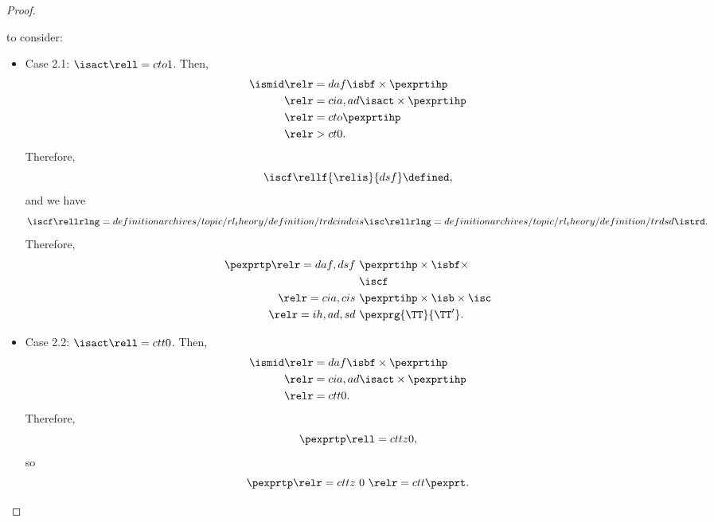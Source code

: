 \begin{proof}
\begin{itemize}
       to consider:
      \begin{itemize}
        \item Case 2.1: $\isact \rell = cto 1$.
          Then,
          \begin{align*}
            \ismid &\relr = daf \isbf \times \pexprtihp\\
                   &\relr = cia,ad \isact \times \pexprtihp\\
                   &\relr = cto \pexprtihp\\
                   &\relr > ct 0.
          \end{align*}
          Therefore, 
          $$\iscf \rellf{\relis}{dsf} \defined,$$
          and we have
          $$\iscf 
          \rellrlng = definition archives/topic/rl_theory/definition/trdcind cis \isc 
          \rellrlng = definition archives/topic/rl_theory/definition/trd sd \istrd.$$
          Therefore,
          \begin{align*}
            \pexprtp 
            \relr = daf,dsf \ & \pexprtihp \times \isbf \times\\& \iscf\\
            \relr = cia,cis \ & \pexprtihp \times \isb \times \isc\\
            \relr = ih,ad,sd \ & \pexprg{\TT}{\TT'}.
          \end{align*}
        \item Case 2.2: $\isact \rell = ctt 0$.
          Then,
          \begin{align*}
            \ismid &\relr = daf \isbf \times \pexprtihp\\
                   &\relr = cia,ad \isact \times \pexprtihp\\
                   &\relr = ctt 0.
          \end{align*}
          Therefore,
          $$\pexprtp \rell = cttz 0,$$
          so
          $$\pexprtp
          \relr = cttz \ 0 \ 
          \relr = ctt \pexprt.$$
      \end{itemize}
  \end{itemize}
\end{proof}
